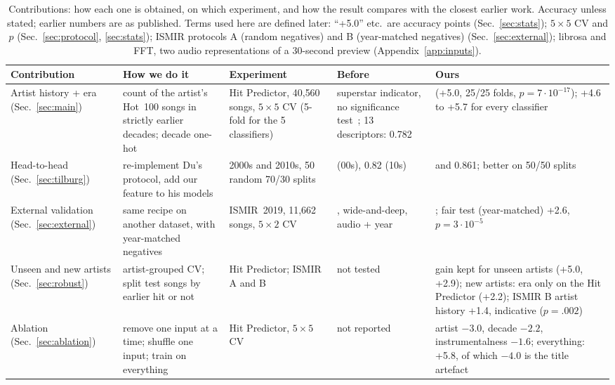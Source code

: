 \documentclass[conference]{IEEEtran}
\begin{document}
\begin{table}[t]
\centering
\caption{Contributions: how each one is obtained, on which experiment, and how the result compares with the
closest earlier work. Accuracy unless stated; earlier numbers are as published. Terms used here are defined later:
``+5.0'' etc.\ are accuracy points (Sec.~\ref{sec:stats}); $5{\times}5$ CV and $p$ (Sec.~\ref{sec:protocol},
\ref{sec:stats}); ISMIR protocols A (random negatives) and B (year-matched negatives) (Sec.~\ref{sec:external});
librosa and FFT, two audio representations of a 30-second preview (Appendix~\ref{app:inputs}).}
\label{tab:contrib}
\footnotesize
\setlength{\tabcolsep}{3pt}
\begin{tabular}{@{}>{\raggedright\arraybackslash}p{2.6cm}>{\raggedright\arraybackslash}p{4.1cm}>{\raggedright\arraybackslash}p{3.3cm}>{\raggedright\arraybackslash}p{3.1cm}>{\raggedright\arraybackslash}p{3.5cm}@{}}
\toprule
Contribution & How we do it & Experiment & Before & Ours \\
\midrule
Artist history + era (Sec.~\ref{sec:main}) & count of the artist's Hot~100 songs in strictly earlier decades; decade one-hot & Hit Predictor, 40{,}560 songs, $5{\times}5$ CV (5-fold for the 5 classifiers) & superstar indicator, no significance test~\cite{interiano2018musical}; 13 descriptors: 0.782 & 0.832 (+5.0, 25/25 folds, $p=7{\cdot}10^{-17}$); +4.6 to +5.7 for every classifier \\
Head-to-head (Sec.~\ref{sec:tilburg}) & re-implement Du's protocol, add our feature to his models & 2000s and 2010s, 50 random 70/30 splits & 0.84 (00s), 0.82 (10s)~\cite{du2022spotify} & 0.867 and 0.861; better on 50/50 splits \\
External validation (Sec.~\ref{sec:external}) & same recipe on another dataset, with year-matched negatives & ISMIR~2019, 11{,}662 songs, $5{\times}2$ CV & 0.750, wide-and-deep, audio + year~\cite{zangerle2019hit} & 0.763; fair test (year-matched) +2.6, $p=3{\cdot}10^{-5}$ \\
Unseen and new artists (Sec.~\ref{sec:robust}) & artist-grouped CV; split test songs by earlier hit or not & Hit Predictor; ISMIR A and B & not tested & gain kept for unseen artists (+5.0, +2.9); new artists: era only on the Hit Predictor (+2.2); ISMIR B artist history +1.4, indicative ($p=.002$) \\
Ablation (Sec.~\ref{sec:ablation}) & remove one input at a time; shuffle one input; train on everything & Hit Predictor, $5{\times}5$ CV & not reported & artist $-3.0$, decade $-2.2$, instrumentalness $-1.6$; everything: +5.8, of which $-4.0$ is the title artefact \\

\end{tabular}
\end{table}
\end{document}
